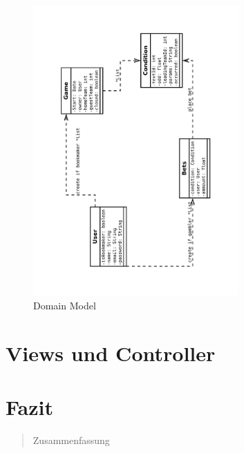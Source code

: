 \documentclass[a4paper, abstracton]{scrartcl}
\begin{document}
  \begin{figure}[h!]
  \begin{center}
    \includegraphics[width=0.7\textwidth,angle=-90]{images/DomainModel.pdf}
  \end{center}
  \caption{Domain Model}
  \label{fig:domain_model}
\end{figure}

\section{Views und Controller}

\section{Fazit}

\begin{abstract}
Zusammenfassung
\end{abstract}
\pagebreak
\tableofcontents	%
\pagebreak
\listoffigures		%

\pagebreak	%


\pagebreak


\pagebreak	
\end{document}
